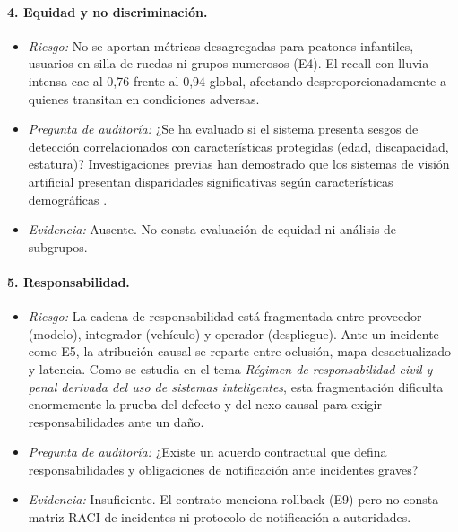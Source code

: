 \documentclass[11pt]{article}
\begin{document}
\paragraph{4. Equidad y no discriminación.}
\begin{itemize}[nosep]
    \item \textit{Riesgo:} No se aportan métricas desagregadas para peatones infantiles, usuarios en silla de ruedas ni grupos numerosos (E4). El recall con lluvia intensa cae al 0,76 frente al 0,94 global, afectando desproporcionadamente a quienes transitan en condiciones adversas.
    \item \textit{Pregunta de auditoría:} ¿Se ha evaluado si el sistema presenta sesgos de detección correlacionados con características protegidas (edad, discapacidad, estatura)? Investigaciones previas han demostrado que los sistemas de visión artificial presentan disparidades significativas según características demográficas \parencite{buolamwini2018gender}.
    \item \textit{Evidencia:} Ausente. No consta evaluación de equidad ni análisis de subgrupos.
\end{itemize}

\paragraph{5. Responsabilidad.}
\begin{itemize}[nosep]
    \item \textit{Riesgo:} La cadena de responsabilidad está fragmentada entre proveedor (modelo), integrador (vehículo) y operador (despliegue). Ante un incidente como E5, la atribución causal se reparte entre oclusión, mapa desactualizado y latencia. Como se estudia en el tema \textit{Régimen de responsabilidad civil y penal derivada del uso de sistemas inteligentes}, esta fragmentación dificulta enormemente la prueba del defecto y del nexo causal para exigir responsabilidades ante un daño.
    \item \textit{Pregunta de auditoría:} ¿Existe un acuerdo contractual que defina responsabilidades y obligaciones de notificación ante incidentes graves?
    \item \textit{Evidencia:} Insuficiente. El contrato menciona rollback (E9) pero no consta matriz RACI de incidentes ni protocolo de notificación a autoridades.
\end{itemize}
\end{document}
